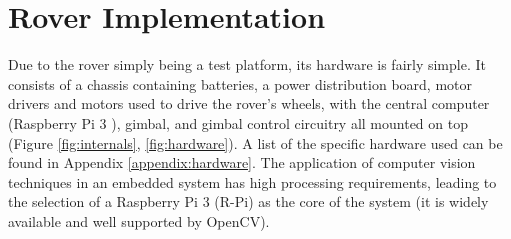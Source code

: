 \chapter{Rover Implementation}
\label{chapter:rover}

Due to the rover simply being a test platform, its hardware is fairly simple. It consists of a chassis containing batteries, a power distribution board, motor drivers and motors used to drive the rover's wheels, with the central computer (Raspberry Pi 3 \cite{pi}), gimbal, and gimbal control circuitry all mounted on top (Figure \ref{fig:internals}, \ref{fig:hardware}). A list of the specific hardware used can be found in Appendix \ref{appendix:hardware}. The application of computer vision techniques in an embedded system has high processing requirements, leading to the selection of a Raspberry Pi 3 (R-Pi) as the core of the system (it is widely available and well supported by OpenCV).

